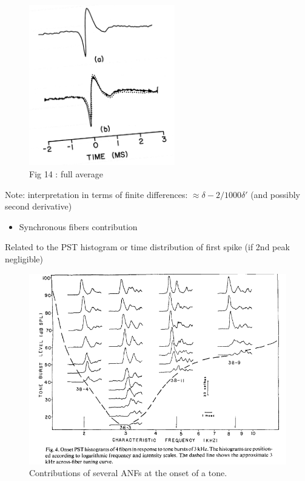 \documentclass[]{article}
\providecommand{\tightlist}{%
  \setlength{\itemsep}{0pt}\setlength{\parskip}{0pt}}
\begin{document}
\begin{figure}
\centering
\includegraphics[width=2.5in,height=\textheight]{./figures/UR.png}
\caption{Fig 14 \citep{Wang1979} : full average}
\end{figure}

Note: interpretation in terms of finite differences:
\(\approx \delta - 2/1000 \delta'\) (and possibly second derivative)

\clearpage

\begin{itemize}
\tightlist
\item
  Synchronous fibers contribution
\end{itemize}

Related to the PST histogram or time distribution of first spike (if 2nd
peak negligible)

\begin{figure}
\centering
\includegraphics[width=5in,height=\textheight]{./figures/PST_tone.png}
\caption{Contributions of several ANFs at the onset of a tone.
\citep{Ozdamar1978}}
\end{figure}
\end{document}
